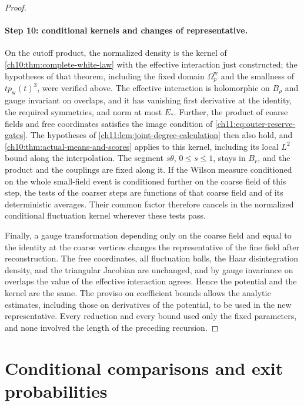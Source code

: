 \begin{proof}
\paragraph{Step 10: conditional kernels and changes of representative.}
On the cutoff product, the normalized density is the kernel of \cref{ch10:thm:complete-white-law} with the effective interaction just constructed; the hypotheses of that theorem, including the fixed domain $\Omega_p^{\mathrm w}$ and the smallness of $tp_{\mathrm w}(t)^3$, were verified above. The effective interaction is holomorphic on $B_\rho$ and gauge invariant on overlaps, and it has vanishing first derivative at the identity, the required symmetries, and norm at most $E_*$. Further, the product of coarse fields and free coordinates satisfies the image condition of \eqref{ch11:eq:outer-reserve-gates}. The hypotheses of \cref{ch11:lem:joint-degree-calculation} then also hold, and \cref{ch10:thm:actual-means-and-scores} applies to this kernel, including its local $L^2$ bound along the interpolation. The segment $s\theta$, $0\le s\le1$, stays in $B_r$, and the product and the couplings are fixed along it. If the Wilson measure conditioned on the whole small-field event is conditioned further on the coarse field of this step, the tests of the coarser steps are functions of that coarse field and of its deterministic averages. Their common factor therefore cancels in the normalized conditional fluctuation kernel wherever these tests pass.

Finally, a gauge transformation depending only on the coarse field and equal to the identity at the coarse vertices changes the representative of the fine field after reconstruction. The free coordinates, all fluctuation balls, the Haar disintegration density, and the triangular Jacobian are unchanged, and by gauge invariance on overlaps the value of the effective interaction agrees. Hence the potential and the kernel are the same. The proviso on coefficient bounds allows the analytic estimates, including those on derivatives of the potential, to be used in the new representative. Every reduction and every bound used only the fixed parameters, and none involved the length of the preceding recursion.
\end{proof}

\section{Conditional comparisons and exit probabilities}\label{ch11:sec:comparison}

